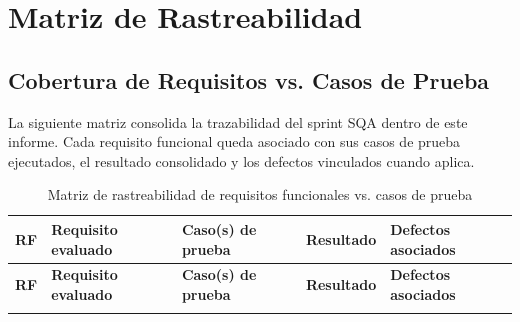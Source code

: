 \chapter{Matriz de Rastreabilidad}
\label{apendice:a}

\section{Cobertura de Requisitos vs. Casos de Prueba}

La siguiente matriz consolida la trazabilidad del sprint SQA dentro de este informe. Cada requisito funcional queda asociado con sus casos de prueba ejecutados, el resultado consolidado y los defectos vinculados cuando aplica.

\begin{landscape}
\begin{longtable}{p{1.4cm}p{5.2cm}p{4.6cm}p{3cm}p{4.6cm}}
\caption{Matriz de rastreabilidad de requisitos funcionales vs. casos de prueba}
\label{tab:matriz-rastreabilidad}\\
\toprule
\textbf{RF} & \textbf{Requisito evaluado} & \textbf{Caso(s) de prueba} & \textbf{Resultado} & \textbf{Defectos asociados}\\
\midrule
\endfirsthead
\toprule
\textbf{RF} & \textbf{Requisito evaluado} & \textbf{Caso(s) de prueba} & \textbf{Resultado} & \textbf{Defectos asociados}\\
\midrule
\endhead
\bottomrule
\endfoot


\end{longtable}
\end{landscape}
